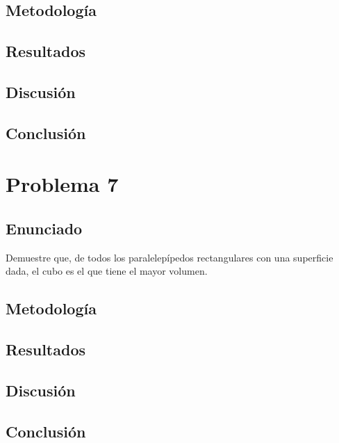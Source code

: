 \documentclass{article}
\begin{document}
\subsection{Metodología}

\subsection{Resultados}
\setcounter{equation}{0}

\subsection{Discusión}

\subsection{Conclusión}

\section{Problema 7}

\subsection{Enunciado}
Demuestre que, de todos los paralelepípedos rectangulares con una superficie dada, el cubo es el que tiene el mayor volumen.

\subsection{Metodología}

\subsection{Resultados}
\setcounter{equation}{0}

\subsection{Discusión}

\subsection{Conclusión}

\end{document}
